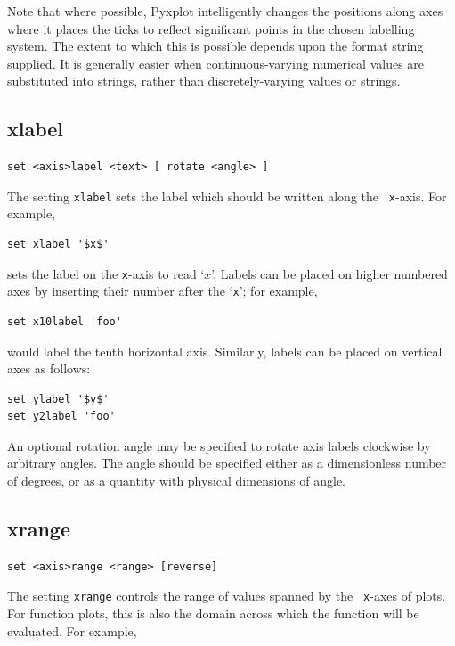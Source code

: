 Note that where possible, Pyxplot intelligently changes the positions along
axes where it places the ticks to reflect significant points in the chosen
labelling system.  The extent to which this is possible depends upon the format
string supplied. It is generally easier when continuous-varying numerical
values are substituted into strings, rather than discretely-varying values or
strings.

\subsection{xlabel}

\begin{verbatim}
set <axis>label <text> [ rotate <angle> ]
\end{verbatim}

The setting {\tt xlabel} sets the label which should be written along the {\tt
x}-axis.  For example,

\begin{verbatim}
set xlabel '$x$'
\end{verbatim}

\noindent sets the label on the {\tt x}-axis to read `$x$'.  Labels can be
placed on higher numbered axes by inserting their number after the `{\tt x}';
for example,

\begin{verbatim}
set x10label 'foo'
\end{verbatim}

\noindent would label the tenth horizontal axis. Similarly, labels can be
placed on vertical axes as follows:

\begin{verbatim}
set ylabel '$y$'
set y2label 'foo'
\end{verbatim}

An optional rotation angle may be specified to rotate axis labels clockwise by
arbitrary angles. The angle should be specified either as a dimensionless
number of degrees, or as a quantity with physical dimensions of angle.

\subsection{xrange}

\begin{verbatim}
set <axis>range <range> [reverse]
\end{verbatim}

The setting {\tt xrange} controls the range of values spanned by the {\tt
x}-axes of plots.  For function plots, this is also the domain across which the
function will be evaluated.  For example,

